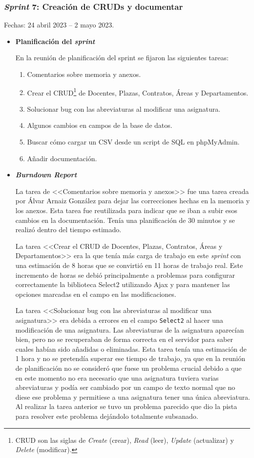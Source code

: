 \subsubsection{\textit{Sprint} 7: Creación de CRUDs y documentar}
Fechas: 24 abril 2023 -- 2 mayo 2023.
\begin{itemize}
\item\textbf{Planificación del \textit{sprint}}


En la reunión de planificación del sprint se fijaron las siguientes tareas:
\begin{enumerate}
		\item Comentarios sobre memoria y anexos.
		\item Crear el CRUD\footnote{CRUD son las siglas de \textit{Create} (crear), \textit{Read} (leer), \textit{Update} (actualizar) y \textit{Delete} (modificar).} de Docentes, Plazas, Contratos, Áreas y Departamentos.
		\item Solucionar bug con las abreviaturas al modificar una asignatura.
		\item Algunos cambios en campos de la base de datos.
		\item Buscar cómo cargar un CSV desde un script de SQL en phpMyAdmin.
		\item Añadir documentación.
\end{enumerate}

\item\textbf{\textit{Burndown Report}}

La tarea de <<Comentarios sobre memoria y anexos>> fue una tarea creada por Álvar Arnaiz González para dejar las correcciones hechas en la memoria y los anexos. 
Esta tarea fue reutilizada para indicar que se iban a subir esos cambios en la documentación. 
Tenía una planificación de 30 minutos y se realizó dentro del tiempo estimado.

La tarea <<Crear el CRUD de Docentes, Plazas, Contratos, Áreas y Departamentos>> era la que tenía más carga de trabajo en este \textit{sprint} con una estimación de 8 horas que se convirtió en 11 horas de trabajo real.
Este incremento de horas se debió principalmente a problemas para configurar correctamente la biblioteca Select2 utilizando Ajax y para mantener las opciones marcadas en el campo en las modificaciones.

La tarea <<Solucionar bug con las abreviaturas al modificar una asignatura>> era debida a errores en el campo \texttt{Select2} al hacer una modificación de una asignatura. 
Las abreviaturas de la asignatura aparecían bien, pero no se recuperaban de forma correcta en el servidor para saber cuales habían sido añadidas o eliminadas.
Esta tarea tenía una estimación de 1 hora y no se pretendía superar ese tiempo de trabajo, ya que en la reunión de planificación no se consideró que fuese un problema crucial debido a que en este momento no era necesario que una asignatura tuviera varias abreviaturas y podía ser cambiado por un campo de texto normal que no diese ese problema y permitiese a una asignatura tener una única abreviatura.
Al realizar la tarea anterior se tuvo un problema parecido que dio la pista para resolver este problema dejándolo totalmente subsanado.


\end{itemize}
